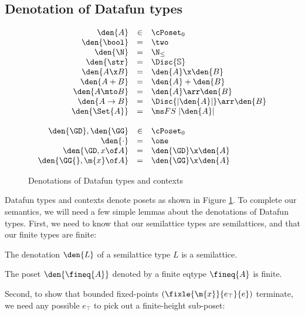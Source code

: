 
\subsection{Denotation of Datafun types}
\begin{figure}
  \[\begin{array}{rcl}
  \den{A} &\in& \cPoset_0\\
  \den{\bool} &=& \two\\
  \den{\N} &=& \N_\le\\
  \den{\str} &=& \Disc{\mathbb{S}}\\
  \den{A \x B} &=& \den{A} \x \den{B}\\
  \den{A + B} &=& \den{A} + \den{B}\\
  \den{A \mto B} &=& \den{A} \arr \den{B}\\
  \den{A \uto B} &=& \Disc{\U{\den{A}}} \arr \den{B}\\
  \den{\Set{A}} &=& \FS{\U{\den{A}}}%
  \\\\
  \den{\GD}, \den{\GG} &\in& \cPoset_0\\
  \den{\cdot} &=& \one\\
  \den{\GD, x\of A} &=& \den{\GD} \x \den{A}\\
  \den{\GG{}, \m{x}\of A} &=& \den{\GG} \x \den{A}
  \end{array}\]
  \caption{Denotations of Datafun types and contexts}
  \label{fig:sem-types}
\end{figure}

Datafun types and contexts denote posets as shown in Figure \ref{fig:sem-types}.
To complete our semantics, we will need a few simple lemmas about the
denotations of Datafun types. First, we need to know that our semilattice types
are semilattices, and that our finite types are finite:

\begin{lemma}
  The denotation $\den{L}$ of a semilattice type $L$ is a semilattice.
\end{lemma}

\begin{lemma}
  The poset $\den{\fineq{A}}$ denoted by a finite eqtype $\fineq{A}$ is finite.
\end{lemma}

Second, to show that bounded fixed-points $(\fixle{\m{x}}{e_\top}{e})$
terminate, we need any possible $e_\top$ to pick out a finite-height sub-poset:


